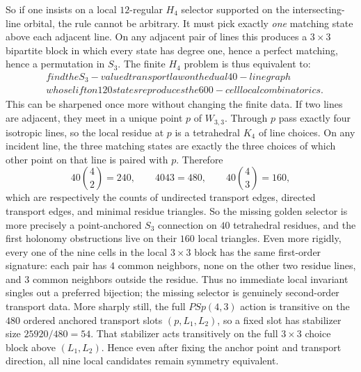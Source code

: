 \documentclass[12pt,a4paper]{article}
\def\mathrm#1{#1}%
\def\text#1{#1}%
\def\cdot{ }%
\theoremstyle{definition}
\newcommand{\PSp}{\mathrm{PSp}}
\begin{document}
So if one insists on a local $12$-regular $H_4$ selector supported on
the intersecting-line orbital, the rule cannot be arbitrary.  It must
pick exactly \emph{one} matching state above each adjacent line.  On any
adjacent pair of lines this produces a $3\times 3$ bipartite block in
which every state has degree one, hence a perfect matching, hence a
permutation in $S_3$.  The finite $H_4$ problem is thus equivalent to:
\[
\boxed{\;
\begin{aligned}
&\text{find the }S_3\text{-valued transport law on the dual 40-line graph}\\
&\text{whose lift on }120\text{ states reproduces the }600\text{-cell local combinatorics.}
\end{aligned}
\;}
\]
This can be sharpened once more without changing the finite data.  If
two lines are adjacent, they meet in a unique point $p$ of $W_{3,3}$.
Through $p$ pass exactly four isotropic lines, so the local residue at
$p$ is a tetrahedral $K_4$ of line choices.  On any incident line, the
three matching states are exactly the three choices of which other point
on that line is paired with $p$.  Therefore
\[
40\cdot \binom{4}{2}=240,
\qquad
40\cdot 4\cdot 3=480,
\qquad
40\cdot \binom{4}{3}=160,
\]
which are respectively the counts of undirected transport edges,
directed transport edges, and minimal residue triangles.  So the missing
golden selector is more precisely a point-anchored $S_3$ connection on
$40$ tetrahedral residues, and the first holonomy obstructions live on
their $160$ local triangles.  Even more rigidly, every one of the nine
cells in the local $3\times 3$ block has the same first-order signature:
each pair has $4$ common neighbors, none on the other two residue lines,
and $3$ common neighbors outside the residue.  Thus no immediate local
invariant singles out a preferred bijection; the missing selector is
genuinely second-order transport data.  More sharply still, the full
$\PSp(4,3)$ action is transitive on the $480$ ordered anchored transport
slots $(p,L_1,L_2)$, so a fixed slot has stabilizer size
$25920/480=54$.  That stabilizer acts transitively on the full
$3\times 3$ choice block above $(L_1,L_2)$.  Hence even after fixing the
anchor point and transport direction, all nine local candidates remain
symmetry equivalent.
\end{document}
